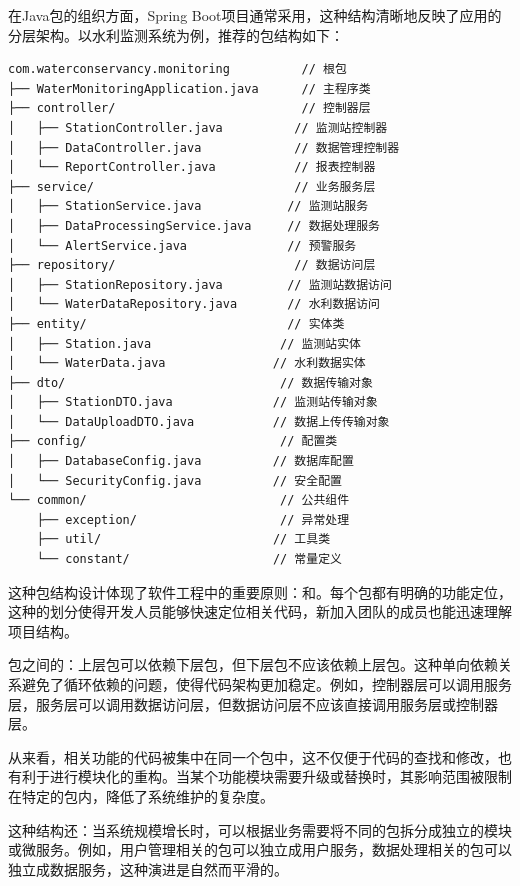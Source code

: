 在Java包的组织方面，Spring Boot项目通常采用，这种结构清晰地反映了应用的分层架构。以水利监测系统为例，推荐的包结构如下：

\begin{lstlisting}[style=java]
com.waterconservancy.monitoring          // 根包
├── WaterMonitoringApplication.java      // 主程序类
├── controller/                          // 控制器层
│   ├── StationController.java          // 监测站控制器
│   ├── DataController.java             // 数据管理控制器
│   └── ReportController.java           // 报表控制器
├── service/                            // 业务服务层
│   ├── StationService.java            // 监测站服务
│   ├── DataProcessingService.java     // 数据处理服务
│   └── AlertService.java              // 预警服务
├── repository/                         // 数据访问层
│   ├── StationRepository.java         // 监测站数据访问
│   └── WaterDataRepository.java       // 水利数据访问
├── entity/                            // 实体类
│   ├── Station.java                  // 监测站实体
│   └── WaterData.java               // 水利数据实体
├── dto/                              // 数据传输对象
│   ├── StationDTO.java              // 监测站传输对象
│   └── DataUploadDTO.java           // 数据上传传输对象
├── config/                           // 配置类
│   ├── DatabaseConfig.java          // 数据库配置
│   └── SecurityConfig.java          // 安全配置
└── common/                           // 公共组件
    ├── exception/                    // 异常处理
    ├── util/                        // 工具类
    └── constant/                    // 常量定义
\end{lstlisting}

这种包结构设计体现了软件工程中的重要原则：和。每个包都有明确的功能定位，这种的划分使得开发人员能够快速定位相关代码，新加入团队的成员也能迅速理解项目结构。

包之间的：上层包可以依赖下层包，但下层包不应该依赖上层包。这种单向依赖关系避免了循环依赖的问题，使得代码架构更加稳定。例如，控制器层可以调用服务层，服务层可以调用数据访问层，但数据访问层不应该直接调用服务层或控制器层。

从来看，相关功能的代码被集中在同一个包中，这不仅便于代码的查找和修改，也有利于进行模块化的重构。当某个功能模块需要升级或替换时，其影响范围被限制在特定的包内，降低了系统维护的复杂度。

这种结构还：当系统规模增长时，可以根据业务需要将不同的包拆分成独立的模块或微服务。例如，用户管理相关的包可以独立成用户服务，数据处理相关的包可以独立成数据服务，这种演进是自然而平滑的。

